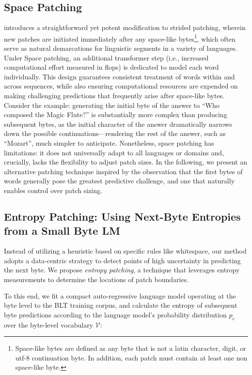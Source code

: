 \subsection{Space Patching}
\label{section:white-patch}

\citet{slagle2024spacebyte} introduces a straightforward yet potent modification to strided patching, wherein new patches are initiated immediately after any space-like bytes\footnote{
    Space-like bytes are defined as any byte that is not a latin character, digit, or utf-8 continuation byte. In addition, each patch must contain at least one non space-like byte. }, which often serve as natural demarcations for linguistic segments in a variety of languages. Under Space patching, an additional transformer step (i.e., increased computational effort measured in flops) is dedicated to model each word individually. This design guarantees consistent treatment of words within and across sequences, while also ensuring computational resources are expended on making challenging predictions that frequently arise after space-like bytes. Consider the example: generating the initial byte of the answer to ``Who composed the Magic Flute?\uline{\hspace{.6em}}'' is substantially more complex than producing subsequent bytes, as the initial character of the answer dramatically narrows down the possible continuations—rendering the rest of the answer, such as ``Mozart'', much simpler to anticipate. Nonetheless, space patching has limitations: it does not universally adapt to all languages or domains and, crucially, lacks the flexibility to adjust patch sizes. In the following, we present an alternative patching technique inspired by the observation that the first bytes of words generally pose the greatest predictive challenge, and one that naturally enables control over patch sizing.

\subsection{Entropy Patching: Using Next-Byte Entropies from a Small Byte LM}
\label{section:dyn-patch}

Instead of utilizing a heuristic based on specific rules like whitespace, our method adopts a data-centric strategy to detect points of high uncertainty in predicting the next byte. We propose \textit{entropy patching}, a technique that leverages entropy measurements to determine the locations of patch boundaries.

To this end, we fit a compact auto-regressive language model operating at the byte level to the {\textsc BLT} training corpus, and calculate the entropy of subsequent byte predictions according to the language model's probability distribution $p_{e}$ over the byte-level vocabulary $\mathcal{V}$:

